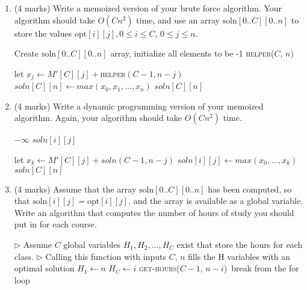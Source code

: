 \documentclass[11pt]{article}
\newcommand{\opt}{\mbox{opt}}
\newcommand{\solnn}{\mbox{soln}}
\begin{document}
\begin{enumerate}
\item (4 marks)
Write a memoized version of your brute force algorithm.
Your algorithm should take $O(Cn^2)$ time, and use an array $\solnn[0..C][0..n]$ to
  store the values $\opt[i][j], 0 \le i \le C$, $0 \le j \le n$.

\begin{soln}
\begin{algorithmic}[1]
\State Create $\solnn[0..C][0..n]$ array, initialize all elements to be -1
\State \Return \textsc{helper}($C$, $n$)\
\EndFunction

\State {}
\EndIf
{}
    \State let $x_j \gets M'[C][j] + $\textsc{helper}$(C-1,n-j)$\
    \EndFor
    \State $soln[C][n] \gets max(x_0, x_1, ... , x_n)$
\EndIf
\State \Return $soln[C][n]$
\EndFunction

\end{algorithmic}
\end{soln}

\item (4 marks)
Write a dynamic programming version of your memoized algorithm.
Again, your algorithm should take $O(Cn^2)$ time.

\begin{soln}
\begin{algorithmic}[1]
\State \Return $-\infty$
\Else
\State \Return $soln[i][j]$
\EndIf
\EndFunction

    \State {}
\EndIf
{}
            \State let $x_k \gets M'[C][j] + soln(C-1,n-j)$
        \EndFor
        \State $soln[i][j] \gets max(x_0,...,x_k)$
    \EndFor
\EndFor
\State \Return $soln[C][n]$
\EndFunction

\end{algorithmic}
\end{soln}
 \newpage

\item  (4 marks)
  Assume that the array $\solnn[0..C][0..n]$ has been computed, so that $\solnn[i][j] = \opt[i][j]$, and the array is available as a global variable. Write an algorithm that computes the number of hours of study you should put in for each course.
  
  
\begin{soln}
\begin{algorithmic}[1]
\State $\triangleright$ Assume $C$ global variables $H_1, H_2,...,H_C$ exist that store the hours for each class.
\State $\triangleright$ Calling this function with inputs $C$, $n$ fills the H variables with an optimal solution
\If{$C==1$}
    \State $H_1 \gets n$ 
\EndIf
{}
        \State $H_C \gets i$
        \State \textsc{get-hours}($C-1$, $n-i$)\
        \State break from the for loop
    \EndIf
\EndFor
\EndFunction
\end{algorithmic}
\end{soln}
  
\end{enumerate}
\end{document}
